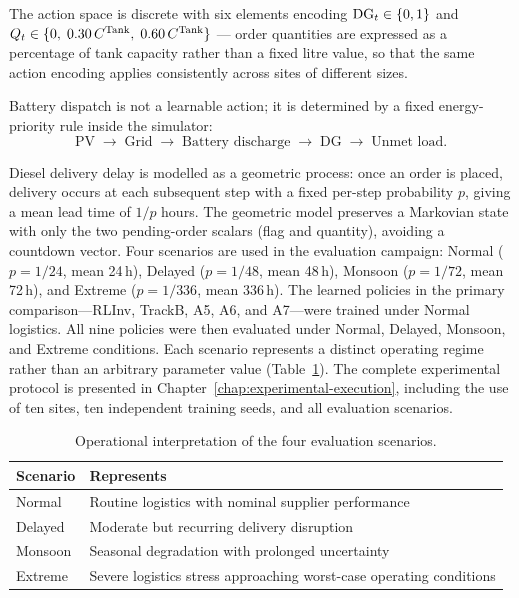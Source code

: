 The action space is discrete with six elements encoding
$\mathrm{DG}_t \in \{0,1\}$ and $Q_t \in \{0,\;0.30\,C^{\mathrm{Tank}},\;0.60\,C^{\mathrm{Tank}}\}$
--- order quantities are expressed as a percentage of tank capacity rather
than a fixed litre value, so that the same action encoding applies
consistently across sites of different sizes.

Battery
dispatch is not a learnable action; it is determined by a fixed
energy-priority rule inside the simulator:
\[
\text{PV} \;\to\; \text{Grid} \;\to\; \text{Battery discharge}
\;\to\; \text{DG} \;\to\; \text{Unmet load.}
\]


Diesel delivery delay is modelled as a geometric process: once an order is
placed, delivery occurs at each subsequent step with a fixed per-step
probability $p$, giving a mean lead time of $1/p$ hours. The geometric
model preserves a Markovian state with only the two pending-order scalars
(flag and quantity), avoiding a countdown vector. Four scenarios are used
in the evaluation campaign: Normal ($p=1/24$, mean 24\,h), Delayed
($p=1/48$, mean 48\,h), Monsoon ($p=1/72$, mean 72\,h), and Extreme
($p=1/336$, mean 336\,h). The learned policies in the primary
comparison---RLInv, TrackB, A5, A6, and A7---were trained under Normal
logistics. All nine policies were then evaluated under Normal, Delayed,
Monsoon, and Extreme conditions.
Each scenario represents a distinct operating regime rather than an
arbitrary parameter value (Table~\ref{tab:scenario_meaning}).
The complete experimental protocol is presented in
Chapter~\ref{chap:experimental-execution}, including the use of ten
sites, ten independent training seeds, and all evaluation scenarios.

\begin{table}[htb]
\centering
\small
\caption{Operational interpretation of the four evaluation scenarios.}
\label{tab:scenario_meaning}
\begin{tabular}{lp{7.5cm}}
\toprule
\textbf{Scenario} & \textbf{Represents} \\
\midrule
Normal   & Routine logistics with nominal supplier performance \\
Delayed  & Moderate but recurring delivery disruption \\
Monsoon  & Seasonal degradation with prolonged uncertainty \\
Extreme  & Severe logistics stress approaching worst-case operating
           conditions \\
\bottomrule
\end{tabular}
\end{table}

